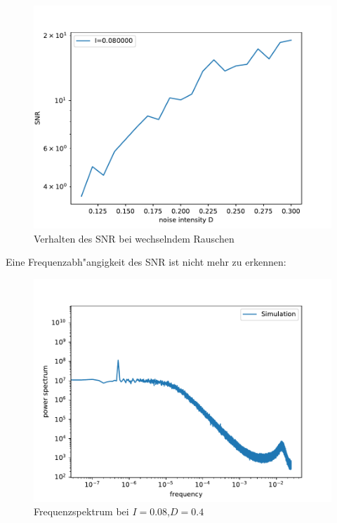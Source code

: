 \documentclass[12pt,a4paper]{article}
\begin{document}
\begin{figure}[H]
	\centering
	\includegraphics[scale=0.9]{snrrealdrange6aem2.pdf}
	\caption{Verhalten des SNR bei wechselndem Rauschen}
	\label{snrf1}
\end{figure}
Eine Frequenzabh"angigkeit des SNR ist nicht mehr zu erkennen:
\begin{figure}[H]
	\centering
	\includegraphics[scale=0.9]{inapikrealfrange8a1.pdf}
	\caption{Frequenzspektrum bei $I=0.08$,$D=0.4$}
	\label{snrf2}
\end{figure}
\end{document}
